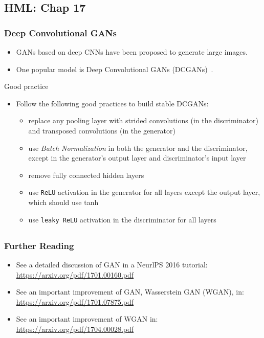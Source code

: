 \documentclass{beamer}
\begin{document}
\subsection{HML: Chap 17}
\begin{frame}
\setlength{\leftmargini}{0.3cm}
\setlength{\leftmarginii}{0.6cm}
\setlength{\leftmarginiii}{0.9cm}
\frametitle{Deep Convolutional GANs}
\begin{itemize}
\item GANs based on deep CNNs have been proposed to generate large images.
\item One popular model is Deep Convolutional GANs (DCGANs)~\cite{radford2015unsupervised}.
\end{itemize}
\vspace{-0.4cm}
\begin{bclogo}
[couleur = green!30,
arrondi = 0,
ombre = false]
{Good practice}
\setlength{\leftmargini}{0.2cm}
\setlength{\leftmarginii}{0.2cm}
\begin{itemize}
\item Follow the following good practices to build stable DCGANs:
	\begin{itemize}
	\item replace any pooling layer with strided convolutions (in the discriminator) and transposed convolutions (in the generator)
	\item use \emph{Batch Normalization} in both the generator and the discriminator, except in the generator's output layer and discriminator's input layer
	\item remove fully connected hidden layers
	\item use \texttt{ReLU} activation in the generator for all layers except the output layer, which should use tanh
	\item use \texttt{leaky ReLU} activation in the discriminator for all layers
	\end{itemize}
\end{itemize}
\end{bclogo}
\end{frame}

\subsection{}
\begin{frame}
\setlength{\leftmargini}{0.3cm}
\setlength{\leftmarginii}{0.6cm}
\setlength{\leftmarginiii}{0.9cm}
\frametitle{Further Reading}
\begin{itemize}
\item See a detailed discussion of GAN in a NeurlPS 2016 tutorial:
\textcolor{blue}{\underline{\url{https://arxiv.org/pdf/1701.00160.pdf}}}
\item See an important improvement of GAN, Wasserstein GAN (WGAN), in:
\textcolor{blue}{\underline{\url{https://arxiv.org/pdf/1701.07875.pdf}}}
\item See an important improvement of WGAN in:
\textcolor{blue}{\underline{\url{https://arxiv.org/pdf/1704.00028.pdf}}}
\end{itemize}
\end{frame}
\end{document}
